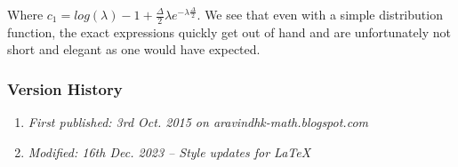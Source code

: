 Where $c_1 = log(\lambda) - 1 + \frac{\Delta}{2}\lambda e^{-\lambda\frac{\Delta}{2}}$. We see that even with a simple distribution function, the exact expressions quickly get out of hand and are unfortunately not short and elegant as one would have expected.

\subsubsection{Version History}
\begin{enumerate}
	\item \emph{First published: 3rd Oct. 2015 on aravindhk-math.blogspot.com}
	\item \emph{Modified: 16th Dec. 2023 -- Style updates for \LaTeX}
\end{enumerate}
